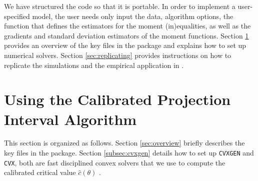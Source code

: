 \documentclass[12pt]{article}
\def\code#1{\texttt{#1}}
\begin{document}
 We have structured the code so that it is portable.  In order to implement a user-specified model, the user needs only input the data, algorithm options, the function that defines the estimators for the moment (in)equalities, as well as the gradients and standard deviation estimators of the moment functions.    Section \ref{sec:using} provides an overview of the key files in the package and explains how to set up numerical solvers.  Section \ref{sec:replicating} provides instructions on how to replicate the simulations and the empirical application in .   


\section{Using the Calibrated Projection Interval Algorithm} \label{sec:using}
   This section is organized as follows.  Section \ref{sec:overview} briefly describes the key files in the package.  Section \ref{subsec:cvxgen} details how to set up \code{CVXGEN} and \code{CVX}, both are fast disciplined convex solvers that we use to compute the calibrated critical value $\hat c(\theta)$ \cite{mattingley2012cvxgen,cvx,gb08}. 
\end{document}

